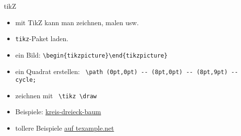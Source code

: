 \begin{frame}[fragile]{tikZ}
    \begin{itemize}[<+->]
        \item mit TikZ kann man zeichnen, malen usw.
        \item \texttt{tikz}-Paket laden.
        \item ein Bild: \lstinline|\begin{tikzpicture}\end{tikzpicture}|
        \item ein Quadrat erstellen: \lstinline| \path (0pt,0pt) -- (8pt,0pt) -- (8pt,9pt) -- cycle;|
        \item zeichnen mit \lstinline| \tikz \draw |
        \item Beispiele: \href{https://github.com/inktrap/LaTeXKurs/tree/master/5/tex/tikz}{kreis-dreieck-baum}
        \item tollere Beispiele \href{http://www.texample.net/tikz/examples/}{auf texample.net}
    \end{itemize}
\end{frame}
